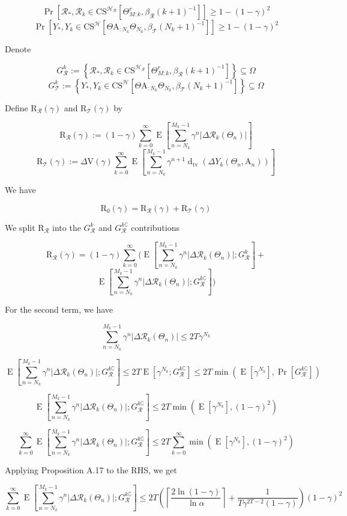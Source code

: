\documentclass[a4paper]{article}
\newcommand{\AP}[1]{\left(#1\right)}
\newcommand{\AB}[1]{\left[#1\right]}
\newcommand{\AC}[1]{\left\{#1\right\}}
\newcommand{\Abs}[1]{\left\vert #1 \right\vert}
\newcommand{\Ceil}[1]{\left\lceil #1 \right\rceil}
\newcommand{\Pb}[1]{\operatorname{Pr}\AB{#1}}
\newcommand{\E}[1]{\operatorname{E}\AB{#1}}
\newcommand{\Dtva}[1]{\operatorname{d}_{\text{tv}}\AP{#1}}
\newcommand{\R}{\mathcal{R}}
\newcommand{\T}{\mathcal{T}}
\newcommand{\Hy}{\mathcal{H}}
\newcommand{\V}{\mathrm{V}}
\newcommand{\Reg}{\mathrm{R}}
\newcommand{\THy}{Y_*}
\newcommand{\SHy}{Y}
\newcommand{\AT}{\mathrm{A}}
\newcommand{\ET}{N}
\newcommand{\IT}{M}
\newcommand{\CSE}{G}
\newcommand{\CS}{\mathrm{CS}}
\begin{document}
$$\Pb{\R_*,\R_k\in\CS^{\Hy_\R}\AB{\Theta_{M:k}^{r},\beta_\R(k+1)^{-1}}} \geq 1-(1-\gamma)^2$$
$$\Pb{\THy,\SHy_{k}\in\CS^\Hy\AB{\Theta\AT_{:N_k}\Theta_{N_k},\beta_\T\AP{N_k+1}^{-1}}} \geq 1-(1-\gamma)^2$$

Denote

$$\CSE_\R^k:=\AC{\R_*,\R_k\in\CS^{\Hy_\R}\AB{\Theta_{M:k}^{r},\beta_\R(k+1)^{-1}}}\subseteq\Omega$$
$$\CSE_\T^k:=\AC{\THy,\SHy_{k}\in\CS^\Hy\AB{\Theta\AT_{:N_k}\Theta_{N_k},\beta_\T\AP{N_k+1}^{-1}}}\subseteq\Omega$$

Define $\Reg_{\R}(\gamma)$ and $\Reg_{\T}(\gamma)$ by

$$\Reg_{\R}(\gamma):=(1-\gamma)\sum_{k=0}^\infty\E{\sum_{n=\ET_k}^{\IT_k-1}\gamma^{n}\Abs{\Delta\R_k\AP{\Theta_n}}}$$
$$\Reg_{\T}(\gamma):=\Delta\V(\gamma)\sum_{k=0}^\infty\E{\sum_{n=\ET_k}^{\IT_k-1}\gamma^{n+1}\Dtva{\Delta\SHy_k\AP{\Theta_n,\AT_n}}}$$

We have

$$\Reg_0(\gamma)=\Reg_{\R}(\gamma)+\Reg_{\T}(\gamma)$$

We split $\Reg_{\R}$ into the $\CSE_\R^k$ and $\CSE_\R^{k\complement}$ contributions

$$\Reg_{\R}(\gamma)=(1-\gamma)\sum_{k=0}^\infty\Bigg(\E{\sum_{n=\ET_k}^{\IT_k-1}\gamma^{n}\Abs{\Delta\R_k\AP{\Theta_n}};\CSE_\R^k}+$$
$$\E{\sum_{n=\ET_k}^{\IT_k-1}\gamma^{n}\Abs{\Delta\R_k\AP{\Theta_n}};\CSE_\R^{k\complement}}\Bigg)$$

For the second term, we have

$$\sum_{n=\ET_k}^{\IT_k-1}\gamma^{n}\Abs{\Delta\R_k\AP{\Theta_n}}\leq2T\gamma^{N_k}$$

$$\E{\sum_{n=\ET_k}^{\IT_k-1}\gamma^{n}\Abs{\Delta\R_k\AP{\Theta_n}};\CSE_\R^{k\complement}}\leq2T\E{\gamma^{N_k};\CSE_\R^{k\complement}}\leq2T\min\AP{\E{\gamma^{N_k}},\Pb{\CSE_\R^{k\complement}}}$$

$$\E{\sum_{n=\ET_k}^{\IT_k-1}\gamma^{n}\Abs{\Delta\R_k\AP{\Theta_n}};\CSE_\R^{k\complement}}\leq2T\min\AP{\E{\gamma^{N_k}},(1-\gamma)^2}$$

$$\sum_{k=0}^\infty\E{\sum_{n=\ET_k}^{\IT_k-1}\gamma^{n}\Abs{\Delta\R_k\AP{\Theta_n}};\CSE_\R^{k\complement}}\leq 2T\sum_{k=0}^\infty\min\AP{\E{\gamma^{N_k}},(1-\gamma)^2}$$

Applying Proposition A.17 to the RHS, we get

$$\sum_{k=0}^\infty\E{\sum_{n=\ET_k}^{\IT_k-1}\gamma^{n}\Abs{\Delta\R_k\AP{\Theta_n}};\CSE_\R^{k\complement}}\leq2T\AP{\Ceil{\frac{2\ln(1-\gamma)}{\ln\alpha}}+\frac{1}{T\gamma^{2T-2}(1-\gamma)}}(1-\gamma)^2$$
\end{document}
